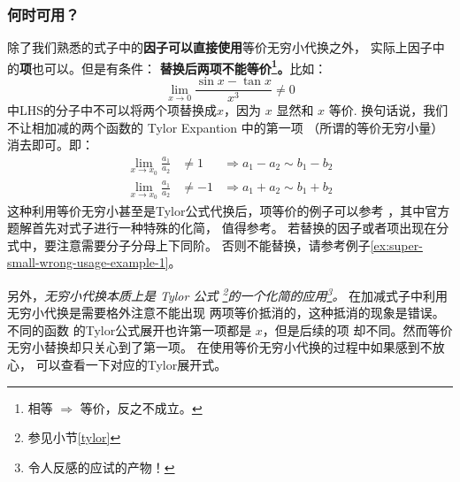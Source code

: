\subsubsection{何时可用？}

除了我们熟悉的式子中的\textbf{因子可以直接使用}等价无穷小代换之外，
实际上因子中的\textbf{项}也可以。但是有条件：
\textbf{替换后两项不能等价\footnote{相等 $\Rightarrow$ 等价，反之不成立。}。}比如：
\[
    \lim_{x \to 0} \frac{\sin{x} - \tan{x} }{x^3} \neq 0
\]
中LHS的分子中不可以将两个项替换成$x$，因为 $x$ 显然和 $x$ 等价.
换句话说，我们不让相加减的两个函数的 Tylor Expantion 中的第一项
（所谓的等价无穷小量）消去即可。即：
\begin{align}
	\lim_{ x\to x_0 } \frac{a_1}{a_2} &\neq 1  &\Rightarrow a_1 - a_2 \sim b_1 - b_2 \\
	\lim_{ x\to x_0 } \frac{a_1}{a_2} &\neq -1 &\Rightarrow a_1 + a_2 \sim b_1 + b_2
\end{align}
这种利用等价无穷小甚至是Tylor公式代换后，项等价的例子可以参考
\cite[question 130]{w660}，其中官方题解首先对式子进行一种特殊的化简，
值得参考。
若替换的因子或者项出现在分式中，要注意需要分子分母上下同阶。
否则不能替换，请参考例子\ref{ex:super-small-wrong-usage-example-1}。

另外，\emph{无穷小代换本质上是 Tylor 公式
\footnote{参见小节\ref{tylor}}的一个化简的应用\footnote{令人反感的应试的产物！}。}
在加减式子中利用无穷小代换是需要格外注意不能出现
两项等价抵消的，这种抵消的现象是错误。不同的函数
的Tylor公式展开也许第一项都是 $x$，但是后续的项
却不同。然而等价无穷小替换却只关心到了第一项。
在使用等价无穷小代换的过程中如果感到不放心，
可以查看一下对应的Tylor展开式。


